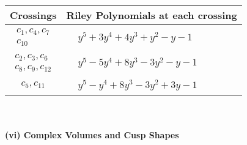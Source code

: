 \documentclass[1p]{elsarticle_modified}
\theoremstyle{definition}
\begin{document}
\begin{tabular}{m{50pt}|m{274pt}}
Crossings & \hspace{64pt}Riley Polynomials at each crossing \\
\hline $$\begin{aligned}c_{1},c_{4},c_{7}\\c_{10}\end{aligned}$$&$\begin{aligned}
&y^5+3 y^4+4 y^3+y^2- y-1
\end{aligned}$\\
\hline $$\begin{aligned}c_{2},c_{3},c_{6}\\c_{8},c_{9},c_{12}\end{aligned}$$&$\begin{aligned}
&y^5-5 y^4+8 y^3-3 y^2- y-1
\end{aligned}$\\
\hline $$\begin{aligned}c_{5},c_{11}\end{aligned}$$&$\begin{aligned}
&y^5- y^4+8 y^3-3 y^2+3 y-1
\end{aligned}$\\
\hline
\end{tabular}\\~\\
\newpage\flushleft \textbf{(vi) Complex Volumes and Cusp Shapes}
\end{document}
